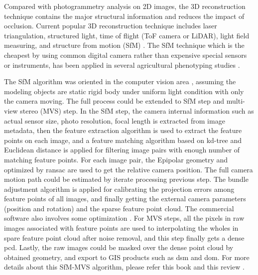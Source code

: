 \documentclass{configs/bmcart}
\begin{document}
Compared with photogrammetry analysis on 2D images, the 3D reconstruction technique contains the major structural information and reduces the impact of occlusion. Current popular 3D reconstruction technique includes laser triangulation, structured light, time of flight (ToF camera or LiDAR), light field measuring, and structure from motion (SfM) \cite{paulus_measuring_2019}. The SfM technique which is the cheapest by using common digital camera rather than expensive special sensors or instruments, has been applied in several agricultural phenotyping studies \cite{jay_-field_2015,sun_three-dimensional_2020, zhu_quantification_2020}.

The SfM algorithm was oriented in the computer vision area \cite{ullman_interpretation_1979}, assuming the modeling objects are static rigid body under uniform light condition with only the camera moving. The full process could be extended to SfM step and multi-view stereo (MVS) step. In the SfM step, the camera internal information such as actual sensor size, photo resolution, focal length is extracted from image metadata, then the feature extraction algorithm is used to extract the feature points on each image, and a feature matching algorithm based on \acrfull*{kd-tree} and Euclidean distance is applied for filtering image pairs with enough number of matching feature points. For each image pair, the Epipolar geometry and optimized by \acrfull*{ransac} are used to get the relative camera position. The full camera motion path could be estimated by iterate processing previous step. The bundle adjustment \cite{triggs_bundle_1999} algorithm is applied for calibrating the projection errors among feature points of all images, and finally getting the external camera parameters (position and rotation) and the sparse feature point cloud. The commercial software also involves some optimization \cite{lowe_distinctive_2004}. For MVS steps, all the pixels in raw images associated with feature points are used to interpolating the wholes in spare feature point cloud after noise removal, and this step finally gets a dense \acrfull*{pcd}. Lastly, the raw images could be masked over the dense point cloud by obtained geometry, and export to GIS products such as \acrfull*{dsm} and \acrfull*{dom}. For more details about this SfM-MVS algorithm, please refer this book \cite{hartley_multiple_2000} and this review \cite{snavely_scene_2010}. 
\end{document}
